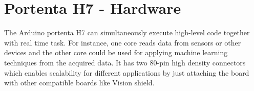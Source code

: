 %
%





\section{Portenta H7 - Hardware}

The Arduino portenta H7 can simultaneously execute high-level code together with real time task. For instance, one core reads data from sensors or other devices and the other core could be used for applying machine learning techniques from the acquired data. It has two 80-pin high density connectors which enables scalability for different applications by just attaching the board with other compatible boards like Vision shield.\cite{PortentaH7:2021}
\vspace*{-\baselineskip}

